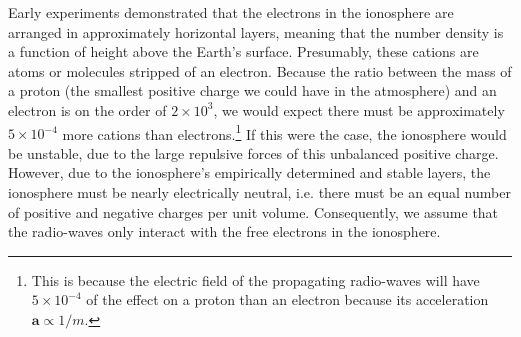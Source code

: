 \documentclass[11pt]{article}
\numberwithin{equation}{section}
\begin{document}
Early experiments demonstrated that the electrons in the ionosphere are arranged in approximately horizontal layers, meaning that the number density is a function of height above the Earth's surface. Presumably, these cations are  atoms or molecules stripped of an electron. Because the ratio between the mass of a proton (the smallest positive charge we could have in the atmosphere) and an electron is on the order of $2\times10^3$, we would expect there must be approximately $5 \times10^{-4}$ more cations than electrons.\footnote{This is because the electric field of the propagating radio-waves will have $5 \times10^{-4}$ of the effect on a proton than an electron because its acceleration $\mathbf{a} \propto 1/m$.} If this were the case, the ionosphere would be unstable, due to the large repulsive forces of this unbalanced positive charge. However, due to the ionosphere's empirically determined and stable layers, the ionosphere must be nearly electrically neutral, i.e. there must be an equal number of positive and negative charges per unit volume.\cite{budden1961radio} Consequently, we assume that the radio-waves only interact with the free electrons in the ionosphere.
\end{document}
